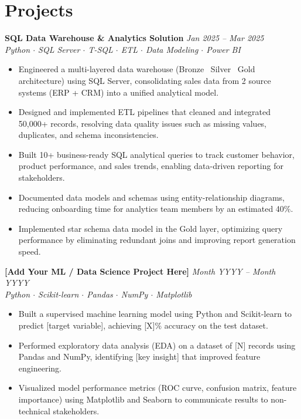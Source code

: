 \documentclass[10pt, letterpaper]{article}
\newcommand{\projheading}[3]{%
  \textbf{#1} \hfill \textit{#3}\\
  \textit{\small #2}
}
\begin{document}
\section{Projects}

\projheading{SQL Data Warehouse \& Analytics Solution}
            {Python \(\cdot\) SQL Server \(\cdot\) T-SQL \(\cdot\) ETL \(\cdot\) Data Modeling \(\cdot\) Power BI}
            {Jan 2025 -- Mar 2025}
\begin{itemize}
  \item Engineered a multi-layered data warehouse (Bronze \textrightarrow\ Silver \textrightarrow\ Gold
        architecture) using SQL Server, consolidating sales data from 2 source systems (ERP + CRM)
        into a unified analytical model.
  \item Designed and implemented ETL pipelines that cleaned and integrated 50{,}000+ records,
        resolving data quality issues such as missing values, duplicates, and schema inconsistencies.
  \item Built 10+ business-ready SQL analytical queries to track customer behavior, product
        performance, and sales trends, enabling data-driven reporting for stakeholders.
  \item Documented data models and schemas using entity-relationship diagrams, reducing
        onboarding time for analytics team members by an estimated 40\%.
  \item Implemented star schema data model in the Gold layer, optimizing query performance by
        eliminating redundant joins and improving report generation speed.
\end{itemize}

\vspace{4pt}
\projheading{[Add Your ML / Data Science Project Here]}
            {Python \(\cdot\) Scikit-learn \(\cdot\) Pandas \(\cdot\) NumPy \(\cdot\) Matplotlib}
            {Month YYYY -- Month YYYY}
\begin{itemize}
  \item Built a supervised machine learning model using Python and Scikit-learn to predict
        [target variable], achieving [X]\% accuracy on the test dataset.
  \item Performed exploratory data analysis (EDA) on a dataset of [N] records using Pandas
        and NumPy, identifying [key insight] that improved feature engineering.
  \item Visualized model performance metrics (ROC curve, confusion matrix, feature importance)
        using Matplotlib and Seaborn to communicate results to non-technical stakeholders.
\end{itemize}
\end{document}
